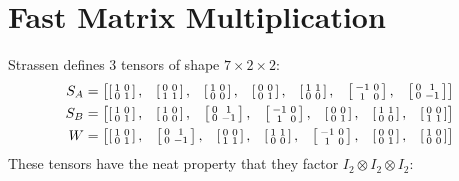 \section{Fast Matrix Multiplication}

Strassen defines 3 tensors of shape $7\times 2\times 2$:
\begin{align*}
   \renewcommand*{\arraystretch}{1}
S_A &= \begin{bmatrix}
\smat{1 & 0\\0 & 1}, &
\smat{0 & 0\\1 & 1}, &
\smat{1 & 0\\0 & 0}, &
\smat{0 & 0\\0 & 1}, &
\smat{1 & 1\\0 & 0}, &
\smat{-1 & 0\\1 & 0}, &
\smat{0 & 1\\0 & -1}
\end{bmatrix}
\\
S_B &= \begin{bmatrix}
\smat{1 & 0\\0 & 1}, &
\smat{1 & 0\\0 & 0}, &
\smat{0 & 1\\0 & -1}, &
\smat{-1 & 0\\1 & 0}, &
\smat{0 & 0\\0 & 1}, &
\smat{1 & 1\\0 & 0}, &
\smat{0 & 0\\1 & 1}
\end{bmatrix}
\\
W &= \begin{bmatrix}
\smat{1 & 0\\0 & 1}, &
\smat{0 & 1\\0 & -1}, &
\smat{0 & 0\\1 & 1}, &
\smat{1 & 1\\0 & 0}, &
\smat{-1 & 0\\1 & 0}, &
\smat{0 & 0\\0 & 1}, &
\smat{1 & 0\\0 & 0}
\end{bmatrix}
\end{align*}
These tensors have the neat property that they factor $I_2\otimes I_2\otimes I_2$:
